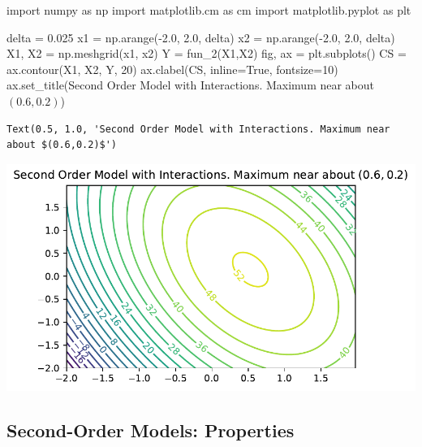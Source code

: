 \documentclass[
  letterpaper,
  DIV=11,
  numbers=noendperiod]{scrreprt}
\newenvironment{Shaded}{\begin{snugshade}}{\end{snugshade}}
\newcommand{\DecValTok}[1]{\textcolor[rgb]{0.68,0.00,0.00}{#1}}
\newcommand{\FloatTok}[1]{\textcolor[rgb]{0.68,0.00,0.00}{#1}}
\newcommand{\ImportTok}[1]{\textcolor[rgb]{0.00,0.46,0.62}{#1}}
\newcommand{\NormalTok}[1]{\textcolor[rgb]{0.00,0.23,0.31}{#1}}
\newcommand{\OperatorTok}[1]{\textcolor[rgb]{0.37,0.37,0.37}{#1}}
\newcommand{\StringTok}[1]{\textcolor[rgb]{0.13,0.47,0.30}{#1}}
\newcommand{\VariableTok}[1]{\textcolor[rgb]{0.07,0.07,0.07}{#1}}
\begin{document}
\begin{Shaded}
\begin{Highlighting}[]
\ImportTok{import}\NormalTok{ numpy }\ImportTok{as}\NormalTok{ np}
\ImportTok{import}\NormalTok{ matplotlib.cm }\ImportTok{as}\NormalTok{ cm}
\ImportTok{import}\NormalTok{ matplotlib.pyplot }\ImportTok{as}\NormalTok{ plt}

\NormalTok{delta }\OperatorTok{=} \FloatTok{0.025}
\NormalTok{x1 }\OperatorTok{=}\NormalTok{ np.arange(}\OperatorTok{{-}}\FloatTok{2.0}\NormalTok{, }\FloatTok{2.0}\NormalTok{, delta)}
\NormalTok{x2 }\OperatorTok{=}\NormalTok{ np.arange(}\OperatorTok{{-}}\FloatTok{2.0}\NormalTok{, }\FloatTok{2.0}\NormalTok{, delta)}
\NormalTok{X1, X2 }\OperatorTok{=}\NormalTok{ np.meshgrid(x1, x2)}
\NormalTok{Y }\OperatorTok{=}\NormalTok{ fun\_2(X1,X2)}
\NormalTok{fig, ax }\OperatorTok{=}\NormalTok{ plt.subplots()}
\NormalTok{CS }\OperatorTok{=}\NormalTok{ ax.contour(X1, X2, Y, }\DecValTok{20}\NormalTok{)}
\NormalTok{ax.clabel(CS, inline}\OperatorTok{=}\VariableTok{True}\NormalTok{, fontsize}\OperatorTok{=}\DecValTok{10}\NormalTok{)}
\NormalTok{ax.set\_title(}\StringTok{\textquotesingle{}Second Order Model with Interactions. Maximum near about $(0.6,0.2)$\textquotesingle{}}\NormalTok{)}
\end{Highlighting}
\end{Shaded}

\begin{verbatim}
Text(0.5, 1.0, 'Second Order Model with Interactions. Maximum near about $(0.6,0.2)$')
\end{verbatim}

\includegraphics{005_num_rsm_files/figure-pdf/cell-9-output-2.pdf}

\subsection{Second-Order Models:
Properties}\label{second-order-models-properties}
\end{document}
